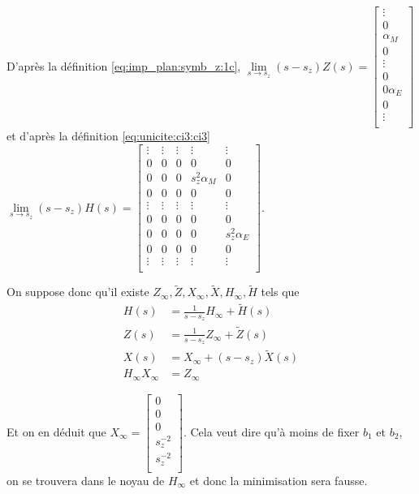 D'après la définition \eqref{eq:imp_plan:symb_z:1c}, \(\lim\limits_{s\rightarrow s_z} (s-s_z) Z(s)
= \begin{bmatrix}
  \vdots \\
  0\\
  \alpha_{M}\\
  0 \\
  \vdots\\
  0 \\
  0 \alpha_{E} \\
  0 \\
  \vdots \\
\end{bmatrix}\) et d'après la définition \eqref{eq:unicite:ci3:ci3} \(\lim\limits_{s\rightarrow s_z} (s-s_z)H(s) =
\begin{bmatrix}
  \vdots & \vdots & \vdots & \vdots &\vdots \\
  0 & 0 & 0 & 0 & 0 \\
  0 & 0 & 0 & s_z^2 \alpha_{M} & 0 \\
  0 & 0 & 0 & 0 & 0 \\
  \vdots & \vdots & \vdots & \vdots &\vdots \\
  0 & 0 & 0 & 0 & 0 \\
  0 & 0 & 0 & 0 & s_z^2 \alpha_{E} \\
  0 & 0 & 0 & 0 & 0 \\
  \vdots & \vdots & \vdots & \vdots &\vdots \\
\end{bmatrix}\).


On suppose donc qu'il existe \(Z_\infty, \tilde{Z},X_\infty, \tilde{X},H_\infty, \tilde{H}\) tels que
\begin{align*}
H(s) &= \frac{1}{s-s_z}H_\infty + \tilde{H}(s) \\
Z(s) &= \frac{1}{s-s_z}Z_\infty + \tilde{Z}(s) \\
X(s) &= X_\infty + (s-s_z)\tilde{X}(s) \\
H_\infty X_\infty &= Z_\infty
\end{align*}

Et on en déduit que \(X_\infty = \begin{bmatrix}
  0\\
  0\\
  0\\
  s_z^{-2}\\
  s_z^{-2}\\
  \end{bmatrix}\). Cela veut dire qu'à moins de fixer \(b_1\) et \(b_2\), on se trouvera dans le noyau de \(H_\infty\) et donc la minimisation sera fausse.

